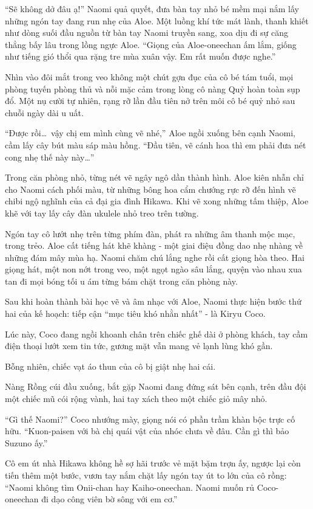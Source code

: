 ﻿\documentclass[../main.tex]{subfiles}
\begin{document}
``Sẽ không dở đâu ạ!'' Naomi quả quyết, đưa bàn tay nhỏ bé mềm mại nắm lấy những ngón tay đang run nhẹ của Aloe. Một luồng khí tức mát lành, thanh khiết như dòng suối đầu nguồn từ bàn tay Naomi truyền sang, xoa dịu đi sự căng thẳng bấy lâu trong lồng ngực Aloe. ``Giọng của Aloe-oneechan ấm lắm, giống như tiếng gió thổi qua rặng tre mùa xuân vậy. Em rất muốn được nghe.''

Nhìn vào đôi mắt trong veo không một chút gợn đục của cô bé tám tuổi, mọi phòng tuyến phòng thủ và nỗi mặc cảm trong lòng cô nàng Quỷ hoàn toàn sụp đổ. Một nụ cười tự nhiên, rạng rỡ lần đầu tiên nở trên môi cô bé quỷ nhỏ sau chuỗi ngày dài u uất.

``Được rồi\dots\ vậy chị em mình cùng vẽ nhé,'' Aloe ngồi xuống bên cạnh Naomi, cầm lấy cây bút màu sáp màu hồng. ``Đầu tiên, vẽ cánh hoa thì em phải đưa nét cong nhẹ thế này này\dots''

Trong căn phòng nhỏ, từng nét vẽ ngây ngô dần thành hình. Aloe kiên nhẫn chỉ cho Naomi cách phối màu, từ những bông hoa cẩm chướng rực rỡ đến hình vẽ chibi ngộ nghĩnh của cả đại gia đình Hikawa. Khi vẽ xong những tấm thiệp, Aloe khẽ với tay lấy cây đàn ukulele nhỏ treo trên tường.

Ngón tay cô lướt nhẹ trên từng phím đàn, phát ra những âm thanh mộc mạc, trong trẻo. Aloe cất tiếng hát khẽ khàng - một giai điệu đồng dao nhẹ nhàng về những đám mây mùa hạ. Naomi chăm chú lắng nghe rồi cất giọng hòa theo. Hai giọng hát, một non nớt trong veo, một ngọt ngào sâu lắng, quyện vào nhau xua tan đi mọi bóng tối u ám từng bám chặt trong căn phòng này.

\ct

Sau khi hoàn thành bài học vẽ và âm nhạc với Aloe, Naomi thực hiện bước thứ hai của kế hoạch: tiếp cận ``mục tiêu khó nhằn nhất'' - là Kiryu Coco.

Lúc này, Coco đang ngồi khoanh chân trên chiếc ghế dài ở phòng khách, tay cầm điện thoại lướt xem tin tức, gương mặt vẫn mang vẻ lạnh lùng khó gần.

Bỗng nhiên, chiếc vạt áo thun của cô bị giật nhẹ hai cái.

Nàng Rồng cúi đầu xuống, bắt gặp Naomi đang đứng sát bên cạnh, trên đầu đội một chiếc mũ cói rộng vành, hai tay xách theo một chiếc giỏ mây nhỏ.

``Gì thế Naomi?'' Coco nhướng mày, giọng nói có phần trầm khàn bộc trực cố hữu. ``Kuon-paisen với bà chị quái vật của nhóc chưa về đâu. Cần gì thì bảo Suzuno ấy.''

Cô em út nhà Hikawa không hề sợ hãi trước vẻ mặt bặm trợn ấy, ngược lại còn tiến thêm một bước, vươn tay nắm chặt lấy ngón tay út to lớn của cô rồng: ``Naomi không tìm Onii-chan hay Kaiho-oneechan. Naomi muốn rủ Coco-oneechan đi dạo công viên bờ sông với em cơ.''
\end{document}
